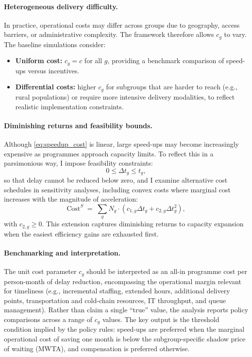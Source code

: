 \documentclass[doublespacing]{utdthesis}
\begin{document}
\paragraph{Heterogeneous delivery difficulty.}
In practice, operational costs may differ across groups due to geography, access barriers, or administrative complexity. The framework therefore allows $c_g$ to vary. The baseline simulations consider:
\begin{itemize}[leftmargin=*]
\item \textbf{Uniform cost:} $c_g=c$ for all $g$, providing a benchmark comparison of speed-ups versus incentives.
\item \textbf{Differential costs:} higher $c_g$ for subgroups that are harder to reach (e.g., rural populations) or require more intensive delivery modalities, to reflect realistic implementation constraints.
\end{itemize}

\paragraph{Diminishing returns and feasibility bounds.}
Although \eqref{eq:speedup_cost} is linear, large speed-ups may become increasingly expensive as programmes approach capacity limits. To reflect this in a parsimonious way, I impose feasibility constraints:
\begin{equation}
0 \le \Delta t_g \le t_g,
\end{equation}
so that delay cannot be reduced below zero, and I examine alternative cost schedules in sensitivity analyses, including convex costs where marginal cost increases with the magnitude of acceleration:
\begin{equation}
\text{Cost}^{S} \;=\; \sum_{g} N_g \cdot \left(c_{1,g}\Delta t_g + c_{2,g}\Delta t_g^{2}\right),
\label{eq:convex_cost}
\end{equation}
with $c_{2,g}\ge 0$. This extension captures diminishing returns to capacity expansion when the easiest efficiency gains are exhausted first.

\paragraph{Benchmarking and interpretation.}
The unit cost parameter $c_g$ should be interpreted as an all-in programme cost per person-month of delay reduction, encompassing the operational margin relevant for timeliness (e.g., incremental staffing, extended hours, additional delivery points, transportation and cold-chain resources, IT throughput, and queue management). Rather than claim a single ``true'' value, the analysis reports policy comparisons across a range of $c_g$ values. The key output is the threshold condition implied by the policy rules: speed-ups are preferred when the marginal operational cost of saving one month is below the subgroup-specific shadow price of waiting (MWTA), and compensation is preferred otherwise.
\end{document}
